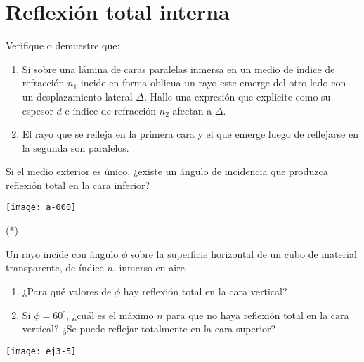\section*{Reflexión total interna}

\item Verifique o demuestre que:\\
\begin{minipage}[t][4.5cm]{0.65\textwidth}
\begin{enumerate}
	\item Si sobre una lámina de caras paralelas inmersa en un medio de índice de refracción \(n_1\) incide en forma oblicua un rayo este emerge del otro lado con un desplazamiento lateral \(\Delta\).
	Halle una expresión que explicite como su espesor \(d\) e índice de refracción \(n_2\) afectan a \(\Delta\). 
	\item El rayo que se refleja en la primera cara y el que emerge luego de reflejarse en la segunda son paralelos.
\end{enumerate}
Si el medio exterior es único, ¿existe un ángulo de incidencia que produzca reflexión total en la cara inferior?
\end{minipage}
\begin{minipage}[c][0cm][t]{0.33\textwidth}
	\texttt{[image: a-000]}
\end{minipage}



\item (*)
\begin{minipage}[t][3.5cm]{0.75\textwidth}
Un rayo incide con ángulo $\phi$ sobre la superficie horizontal de un cubo de material transparente, de índice $n$, inmerso en aire.
\begin{enumerate}
	\item ¿Para qué valores de $\phi$ hay reflexión total en la cara vertical?
	\item Si $\phi=60^{\circ}$, ¿cuál es el máximo $n$ para que no haya reflexión total en la cara vertical?
	¿Se puede reflejar totalmente en la cara superior?
\end{enumerate}
\end{minipage}
\begin{minipage}[c][1.5cm][t]{0.15\textwidth}
	\texttt{[image: ej3-5]}
\end{minipage}



